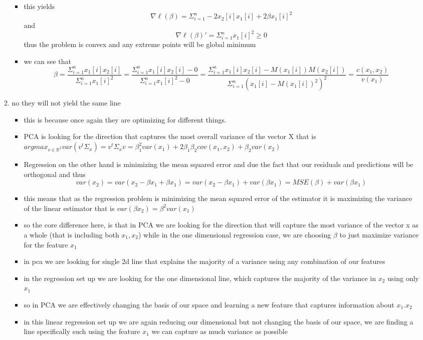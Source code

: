 \documentclass[12pt,twoside]{article}
\begin{document}
\begin{enumerate}
\begin{enumerate}
\begin{itemize}
        \item this yields $$\nabla \ell(\beta)= \Sigma_{i=1}^{n}-2x_{2}[i]x_{1}[i]+2\beta x_{1}[i]^2$$ and $$\nabla \ell (\beta)'=\Sigma_{i=1}^{n}x_{1}[i]^2\geq 0$$ thus the problem is convex and any extreme points will be global minimum 
        \item we can see that $$\beta=\frac{\Sigma_{i=1}^{n}x_{1}[i]x_{2}[i] }{\Sigma_{i=1}^{n}x_{1}[i]^2}=\frac{\Sigma_{i=1}^{n}x_{1}[i]x_{2}[i]-0 }{\Sigma_{i=1}^{n}x_{1}[i]^2-0}=\frac{\Sigma_{i=1}^{n}x_{1}[i]x_{2}[i]-M(x_{1}[i])M(x_{2}[i]) }{\Sigma_{i=1}^{n}(x_{1}[i]-M(x_{1}[i])^2)^2}=\frac{c(x_1,x_2)}{v(x_1)}$$
    \end{itemize}
    \item no they will not yield the same line 
    \begin{itemize}
        \item this is because once again they are optimizing for different things. 
        \item PCA is looking for the direction that captures the most overall variance of the vector X that is $argmax_{v \in \mathbb{R}^2}var(v^t\Sigma_{x})=v^t\Sigma_{x}v=\beta_1^2 var(x_1)+ 2\beta_1\beta_2 cov(x_1,x_2) + \beta_2 var(x_2)$ 
        \item  Regression on the other hand is minimizing the mean squared error and due the fact that our residuals and predictions will be orthogonal and thus $$var(x_2)=var(x_2-\beta x_1 +\beta x_1)=var(x_2-\beta x_1) + var(\beta x_1)=MSE(\beta)+var(\beta x_1)$$
        \item this means that as the regression problem is minimizing the mean squared error of the estimator it is maximizing the variance of the linear estimator that is $var(\beta x_2)=\beta^2 var(x_1)$
        \item so the core difference here, is that in PCA we are looking for the direction that will capture the most variance of the vector x as a whole (that is including both $x_1, x_2$)  while in the one dimensional regression case, we are choosing $\beta$ to just maximize variance for the feature $x_1$
        \item in pca we are looking for single 2d line that explains the majority of a variance using any combination of our features 
        \item in the regression set up we are  looking for the one dimensional line, which captures the majority of the variance in $x_2$ using only $x_1$
        \item so in PCA we are effectively changing the basis of our space and learning a new feature that captures information about $x_1. x_2$
        \item in this linear regression set up we are again reducing our dimensional but not changing the basis of our space, we are finding a line specifically such using the feature $x_1$ we can capture as much variance as possible
        

\end{itemize}
\end{enumerate}
\end{enumerate}
\end{document}

